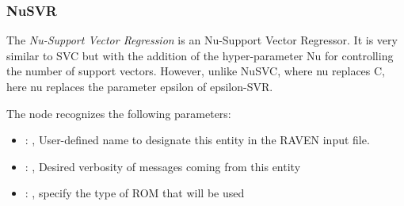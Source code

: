 \subsubsection{NuSVR}
  The  \textit{Nu-Support Vector Regression} is an Nu-Support Vector Regressor.
  It is very similar to SVC but with the addition of the hyper-parameter Nu for controlling the
  number of support vectors. However, unlike NuSVC, where nu replaces C,
  here nu replaces the parameter epsilon of epsilon-SVR.

  The  node recognizes the following parameters:
    \begin{itemize}
      \item {}: , 
        User-defined name to designate this entity in the RAVEN input file.
      \item {}: , 
        Desired verbosity of messages coming from this entity
      \item {}: , 
        specify the type of ROM that will be used
  \end{itemize}

